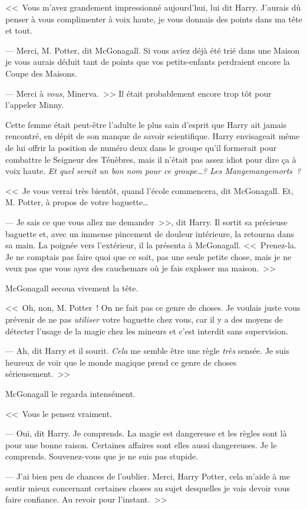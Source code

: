 <<~Vous m'avez grandement impressionné aujourd'hui, lui dit Harry. J'aurais dû penser à vous complimenter à voix haute, je vous donnais des points dans ma tête et tout.

--- Merci, M. Potter, dit McGonagall. Si vous aviez déjà été trié dans une Maison je vous aurais déduit tant de points que vos petits-enfants perdraient encore la Coupe des Maisons.

--- Merci à \emph{vous}, Minerva.~>> Il était probablement encore trop tôt pour l'appeler Minny.

Cette femme était peut-être l'adulte le plus sain d'esprit que Harry ait jamais rencontré, en dépit de son manque de savoir scientifique. Harry envisageait même de lui offrir la position de numéro deux dans le groupe qu'il formerait pour combattre le Seigneur des Ténèbres, mais il n'était pas assez idiot pour dire ça à voix haute. \emph{Et quel serait un bon nom pour ce groupe…? Les Mangemangemorts~?}

<<~Je vous verrai très bientôt, quand l'école commencera, dit McGonagall. Et, M. Potter, à propos de votre baguette…

--- Je sais ce que vous allez me demander~>>, dit Harry. Il sortit sa précieuse baguette et, avec un immense pincement de douleur intérieure, la retourna dans sa main. La poignée vers l'extérieur, il la présenta à McGonagall. <<~Prenez-la. Je ne comptais pas faire quoi que ce soit, pas une seule petite chose, mais je ne veux pas que vous ayez des cauchemars où je fais exploser ma maison.~>>

McGonagall secoua vivement la tête.

<<~Oh, non, M. Potter~! On ne fait pas ce genre de choses. Je voulais juste vous prévenir de ne pas \emph{utiliser} votre baguette chez vous, car il y a des moyens de détecter l'usage de la magie chez les mineurs et c'est interdit sans supervision.

--- Ah, dit Harry et il sourit. \emph{Cela} me semble être une règle \emph{très} sensée. Je suis heureux de voir que le monde magique prend ce genre de choses sérieusement.~>>

McGonagall le regarda intensément.

<<~Vous le pensez vraiment.

--- Oui, dit Harry. Je comprends. La magie est dangereuse et les règles sont là pour une bonne raison. Certaines affaires sont elles aussi dangereuses. Je le comprends. Souvenez-vous que je ne suis pas stupide.

--- J'ai bien peu de chances de l'oublier. Merci, Harry Potter, cela m'aide à me sentir mieux concernant certaines choses au sujet desquelles je vais devoir vous faire confiance. Au revoir pour l'instant.~>>

